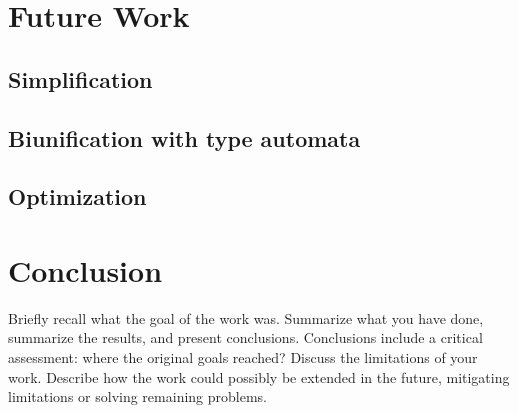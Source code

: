 
\section{Future Work}

\subsection{Simplification}

\subsection{Biunification with type automata}

\subsection{Optimization}

\section{Conclusion}

Briefly recall what the goal of the work was. Summarize what you have done, summarize the results, and present conclusions. Conclusions include a critical assessment: where the original goals reached? Discuss the limitations of your work. Describe how the work could possibly be extended in the future, mitigating limitations or solving remaining problems.


